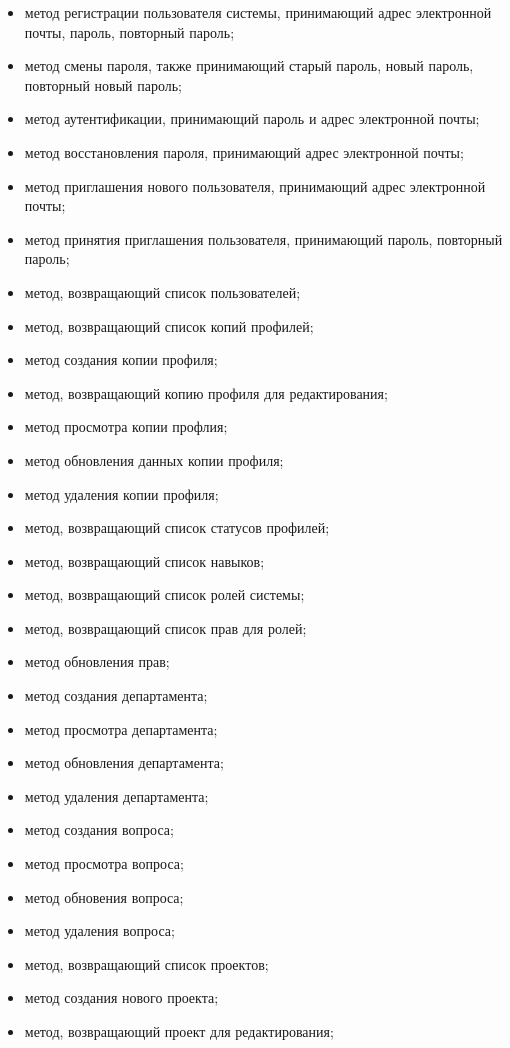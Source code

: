 \begin{itemize}
	\item метод регистрации пользователя системы, принимающий адрес электронной почты, пароль, повторный пароль;
	\item метод смены пароля, также принимающий старый пароль, новый пароль, повторный новый пароль;
	\item метод аутентификации, принимающий пароль и адрес электронной почты;
	\item метод восстановления пароля, принимающий адрес электронной почты;
	\item метод приглашения нового пользователя, принимающий адрес электронной почты;
	\item метод принятия приглашения пользователя, принимающий пароль, повторный пароль;
	\item метод, возвращающий список пользователей;
	\item метод, возвращающий список копий профилей;
	\item метод создания копии профиля;
	\item метод, возвращающий копию профиля для редактирования;
	\item метод просмотра копии профлия;
	\item метод обновления данных копии профиля;
	\item метод удаления копии профиля;
	\item метод, возвращающий список статусов профилей;
	\item метод, возвращающий список навыков;
	\item метод, возвращающий список ролей системы;
	\item метод, возвращающий список прав для ролей;
	\item метод обновления прав;
	\item метод создания департамента;
	\item метод просмотра департамента;
	\item метод обновления департамента;
	\item метод удаления департамента;
	\item метод создания вопроса;
	\item метод просмотра вопроса;
	\item метод обновения вопроса;
	\item метод удаления вопроса;
	\item метод, возвращающий список проектов;
	\item метод создания нового проекта;
	\item метод, возвращающий проект для редактирования;

\end{itemize}
